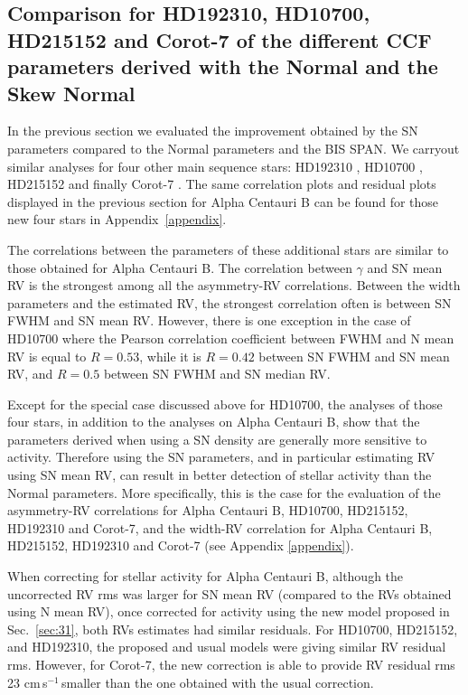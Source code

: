\documentclass{aa}
\def\cms{\hbox{\,cm\,s$^{-1}$}}       %
\begin{document}
\subsection{Comparison for HD192310, HD10700, HD215152 and Corot-7 of the different CCF parameters derived with the Normal and the Skew Normal} \label{sec:real_data_other_stars}

In the previous section we evaluated the improvement obtained by the SN parameters compared to the Normal parameters and the BIS SPAN. We carryout similar analyses for four other main sequence stars: HD192310 \citep[K2V,][]{Pepe-2011}, HD10700 \citep[G8V,][]{Feng:2017ac}, HD215152 \citep[K3V,][]{Delisle:2018aa} and finally Corot-7 \citep[K0V,][]{Haywood-2014}. The same correlation plots and residual plots displayed in the previous section for Alpha Centauri B can be found for those new four stars in Appendix~\ref{appendix}.

The correlations between the parameters of these additional stars are similar to those obtained for Alpha Centauri B. The correlation between $\gamma$ and SN mean RV is the strongest among all the asymmetry-RV correlations. 
%
Between the width parameters and the estimated RV, the strongest correlation often is between SN FWHM and SN mean RV. 
However, there is one exception in the case of HD10700 where the Pearson correlation coefficient between FWHM and N mean RV is equal to $R=0.53$, while it is $R=0.42$ between SN FWHM and SN mean RV, and $R=0.5$ between SN FWHM and SN median RV.

Except for the special case discussed above for HD10700, the analyses of those four stars, in addition to the analyses on Alpha Centauri B, show that the parameters derived when using a SN density are generally more sensitive to activity.  
Therefore using the SN parameters, and in particular estimating RV using SN mean RV, can result in better detection of stellar activity than the Normal parameters. 
More specifically, this is the case for the evaluation of the asymmetry-RV correlations for Alpha Centauri B, HD10700, HD215152, HD192310 and Corot-7, and the width-RV correlation for Alpha Centauri B, HD215152, HD192310 and Corot-7 (see Appendix \ref{appendix}).

When correcting for stellar activity for  Alpha Centauri B, although the uncorrected RV rms was larger for SN mean RV (compared to the RVs obtained using N mean RV), once corrected for activity using the new model proposed in Sec.~\ref{sec:31}, both RVs estimates had similar residuals. 
For HD10700, HD215152, and HD192310, the proposed and usual models were giving similar RV residual rms.
However, for Corot-7, the new correction is able to provide RV residual rms 23\,\cms\,smaller than the one obtained with the usual correction.
\end{document}

